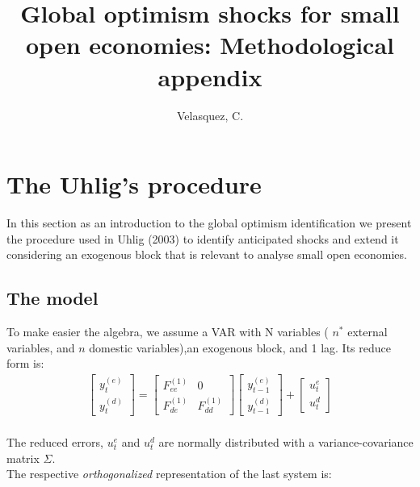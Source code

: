 \documentclass[12pt, a4paper]{article}
\title{\textbf{Global optimism shocks for small open economies: Methodological appendix}}
\author{Velasquez, C.}
\date{}
\begin{document}
	
\maketitle

\section{The Uhlig's procedure}
In this section as an introduction to the global optimism identification we present the procedure used in Uhlig (2003) to identify anticipated shocks and extend it considering an exogenous block that is relevant to analyse small open economies.
 \subsection{The model}
 To make easier the algebra, we assume a VAR with N variables ( $n^*$ external variables, and $n$ domestic variables),an exogenous block, and 1 lag. Its reduce form is:
	\begin{equation}
	   \begin{aligned}
	     \left[ \begin{array}{c}  y^{(e)}_t  \\ y^{(d)}_t \end{array} \right] 
	    =
      	\left[ \begin{array}{cc}  F_{ee}^{(1)} & 0 \\ F_{de}^{(1)} & F_{dd}^{(1)} \end{array} \right] 
		\left[ \begin{array}{c}  y^{(e)}_{t-1}  \\ y^{(d)}_{t-1}  \end{array} \right] 
	 	+
    	\left[ \begin{array}{c}  u^e_{t}  \\ u^d_{t}  \end{array} \right] 
	  \end{aligned}
	\end{equation} \\
	The reduced errors, $u^e_{t}$ and $u^d_{t}$ are normally distributed with a variance-covariance matrix $\Sigma$. \\
	The respective \textit{orthogonalized} representation of the last system is:
\end{document}
